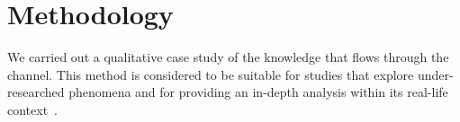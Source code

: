 \section{Methodology}
\label{cha:methodology}

    We carried out a qualitative case study of the knowledge that flows through the channel. 
    This method is considered to be suitable for studies that explore under-researched phenomena and for providing an in-depth analysis within its real-life context~\cite{Yin2009}.








